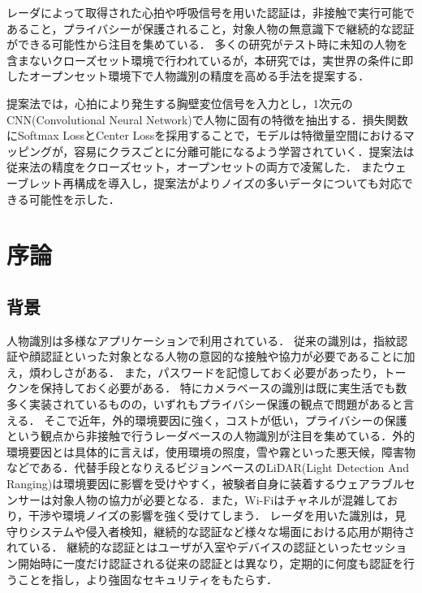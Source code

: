 \begin{jabstract}

レーダによって取得された心拍や呼吸信号を用いた認証は，非接触で実行可能であること，プライバシーが保護されること，対象人物の無意識下で継続的な認証ができる可能性から注目を集めている．
多くの研究がテスト時に未知の人物を含まないクローズセット環境で行われているが，本研究では，実世界の条件に即したオープンセット環境下で人物識別の精度を高める手法を提案する．

提案法では，心拍により発生する胸壁変位信号を入力とし，1次元のCNN(Convolutional Neural Network)で人物に固有の特徴を抽出する．損失関数にSoftmax LossとCenter Lossを採用することで，モデルは特徴量空間におけるマッピングが，容易にクラスごとに分離可能になるよう学習されていく．提案法は従来法の精度をクローズセット，オープンセットの両方で凌駕した．
またウェーブレット再構成を導入し，提案法がよりノイズの多いデータについても対応できる可能性を示した．


\end{jabstract}

\tableofcontents	%
\listoffigures		%
\listoftables		%


\chapter{序論}

\section{背景}
人物識別は多様なアプリケーションで利用されている．
従来の識別は，指紋認証や顔認証といった対象となる人物の意図的な接触や協力が必要であることに加え，煩わしさがある．
また，パスワードを記憶しておく必要があったり，トークンを保持しておく必要がある\cite{paper:password}．
特にカメラベースの識別は既に実生活でも数多く実装されているものの，いずれもプライバシー保護の観点で問題があると言える．
そこで近年，外的環境要因に強く，コストが低い，プライバシーの保護という観点から非接触で行うレーダベースの人物識別が注目を集めている．外的環境要因とは具体的に言えば，使用環境の照度，雪や霧といった悪天候，障害物などである\cite{paper:Wireless_survey, paper:respi_svm, paper:respiratory}．代替手段となりえるビジョンベースのLiDAR(Light Detection And Ranging)は環境要因に影響を受けやすく，被験者自身に装着するウェアラブルセンサーは対象人物の協力が必要となる．また，Wi-Fiはチャネルが混雑しており，干渉や環境ノイズの影響を強く受けてしまう\cite{paper:unsupervised}．
レーダを用いた識別は，見守りシステムや侵入者検知，継続的な認証など様々な場面における応用が期待されている\cite{paper:Wireless_survey}．
継続的な認証とはユーザが入室やデバイスの認証といったセッション開始時に一度だけ認証される従来の認証とは異なり，定期的に何度も認証を行うことを指し，より強固なセキュリティをもたらす\cite{paper:continuous_auth}．

